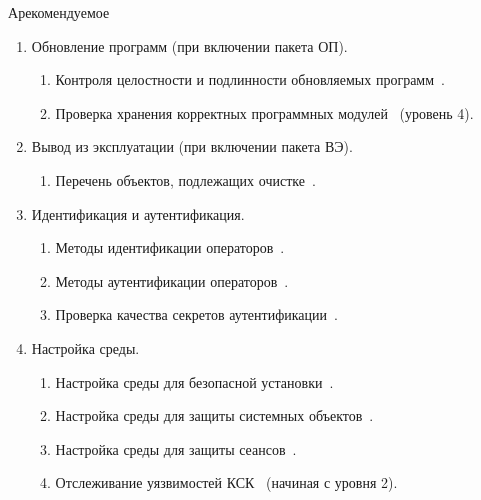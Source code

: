 \begin{appendix}{А}{рекомендуемое}
\begin{enumerate}
\begin{enumerate}
\item
Проверка работоспособности~.

\item
Статистическое тестирование~.
\end{enumerate}

\item
Обновление программ (при включении пакета ОП).

\begin{enumerate}
\item
Контроля целостности и подлинности обновляемых программ~.

\item
Проверка хранения корректных программных модулей~ (уровень 4).
\end{enumerate}

\item
Вывод из эксплуатации (при включении пакета ВЭ).

\begin{enumerate}
\item
Перечень объектов, подлежащих очистке~.
\end{enumerate}

\item
{Идентификация и аутентификация.}

\begin{enumerate}
\item
Методы идентификации операторов~.

\item
Методы аутентификации операторов~.

\item
Проверка качества секретов аутентификации~.
\end{enumerate}

\item
{Настройка среды.}

\begin{enumerate}
\item
Настройка среды для безопасной установки~.

\item
Настройка среды для защиты системных объектов~.

\item
Настройка среды для защиты сеансов~.

\item
Отслеживание уязвимостей КСК~ (начиная с уровня 2).


\end{enumerate}
\end{enumerate}
\end{appendix}
